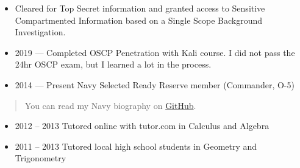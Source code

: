 \documentclass[10pt]{article}
\def\tightlist{}
\begin{document}
\begin{itemize}
\tightlist
\item
  Cleared for Top Secret information and granted access to Sensitive
  Compartmented Information based on a Single Scope Background
  Investigation.
\item
  2019 --- Completed OSCP Penetration with Kali course. I did not pass
  the 24hr OSCP exam, but I learned a lot in the process.
\item
  2014 --- Present Navy Selected Ready Reserve member (Commander, O-5)
\end{itemize}

\begin{quote}
You can read my Navy biography on
\href{https://github.com/jhwohlgemuth/navy-biography}{GitHub}.
\end{quote}

\begin{itemize}
\tightlist
\item
  2012 -- 2013 Tutored online with tutor.com in Calculus and Algebra
\item
  2011 -- 2013 Tutored local high school students in Geometry and
  Trigonometry
\end{itemize}

\end{document}
